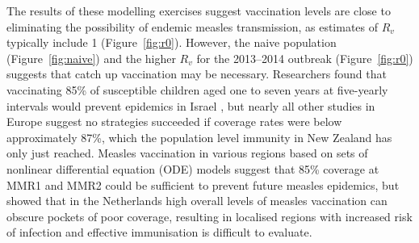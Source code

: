 \documentclass{article}
\begin{document}
The results of these modelling exercises suggest vaccination levels are close to eliminating the possibility of endemic measles transmission, as estimates of $R_v$ typically include 1 (Figure~\ref{fig:r0}). However, the naive population (Figure~\ref{fig:naive}) and the higher $R_v$ for the 2013--2014 outbreak (Figure~\ref{fig:r0}) suggests that catch up vaccination may be necessary. Researchers found that vaccinating 85\% of susceptible children aged one to seven years at five-yearly intervals would prevent epidemics in Israel \citep{agur93}, but nearly all other studies in Europe suggest no strategies succeeded if coverage rates were below approximately 87\%, which the population level immunity in New Zealand has only just reached. Measles vaccination in various regions \citep{agur93, babad95, edmunds0, gay98, wallinga1} based on sets of nonlinear differential equation (ODE) models suggest that 85\% coverage at MMR1 and MMR2 could be sufficient to prevent future measles epidemics, but \citep{glass4} showed that in the Netherlands high overall levels of measles vaccination can obscure pockets of poor coverage, resulting in localised regions with increased risk of infection and effective immunisation is difficult to evaluate.
\end{document}

